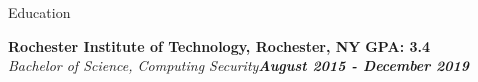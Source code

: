 \documentclass{resume}
\begin{document}

\begin{rSection}{Education}

{\bf Rochester Institute of Technology, Rochester, NY} \hfill { \bf GPA: 3.4 }  
\\ \it Bachelor of Science, Computing Security\hfill {\bf August 2015 - December 2019}

\end{rSection}

\end{document}
